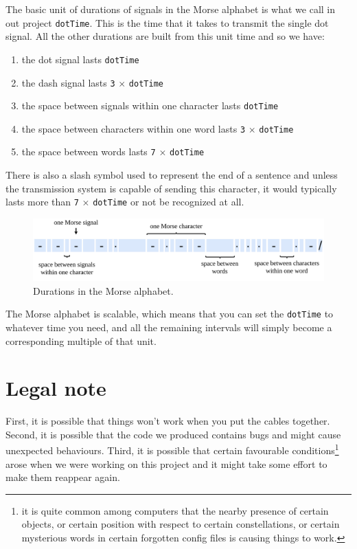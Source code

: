 \documentclass[12pt]{report}
\begin{document}
The basic unit of durations of signals in the Morse alphabet is what we call in out project \verb|dotTime|. This is the time that it takes to transmit the single dot signal. All the other durations are built from this unit time and so we have:

\begin{enumerate}
\item the dot signal lasts \verb|dotTime|

\item the dash signal lasts \verb|3| $\times$ \verb|dotTime|

\item the space between signals within one character lasts \verb|dotTime|

\item the space between characters within one word lasts \verb|3| $\times$ \verb|dotTime|

\item the space between words lasts \verb|7| $\times$ \verb|dotTime|

\end{enumerate}

There is also a slash symbol used to represent the end of a sentence and unless the transmission system is capable of sending this character, it would typically lasts more than \verb|7| $\times$ \verb|dotTime| or not be recognized at all.

\begin{figure}[H]
\centering\includegraphics[width=14.5cm]{morse_durations}
\caption{Durations in the Morse alphabet.}			
\label{fig:morse_durations}
\end{figure}

The Morse alphabet is scalable, which means that you can set the \verb|dotTime| to whatever time you need, and all the remaining intervals will simply become a corresponding multiple of that unit.

\section{Legal note}

First, it is possible that things won't work when you put the cables together. Second, it is possible that the code we produced contains bugs and might cause unexpected behaviours. Third, it is possible that certain favourable conditions\footnote{it is quite common among computers that the nearby presence of certain objects, or certain position with respect to certain constellations, or certain mysterious words in certain forgotten config files is causing things to work.} arose when we were working on this project and it might take some effort to make them reappear again.
\end{document}
